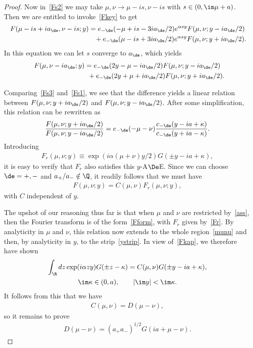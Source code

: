 \documentclass[pdftex]{sigma}
\numberwithin{equation}{section}
\begin{document}
\begin{proof}
Now in~\eqref{Fs2} we may take $\mu,\nu\to \mu-is,\nu-is$ with $s\in(0,\im\mu +a)$. Then we are entitled to invoke~\eqref{Fkey} to get
\begin{gather}
F(\mu-is+ia_{\de},\nu-is;y)     =     e_{-\de}(-\mu+is-3ia_{\de}/2)e^{\alpha sy}F(\mu,\nu;y-ia_{\de}/2)
\nonumber \\
\phantom{F(\mu-is+ia_{\de},\nu-is;y)     =}{}   +e_{-\de}(\mu-is+3ia_{\de}/2)e^{\alpha sy}F(\mu,\nu;y+ia_{\de}/2).
\end{gather}
In this equation we can let $s$ converge to $a_{\de}$, which yields
\begin{gather}
F(\mu,\nu-ia_{\de};y)     =     e_{-\de}(2y-\mu-ia_{\de}/2)F(\mu,\nu;y-ia_{\de}/2)
\nonumber \\
\phantom{F(\mu,\nu-ia_{\de};y)     =}{}  +e_{-\de}(2y+\mu+ia_{\de}/2)F(\mu,\nu;y+ia_{\de}/2).\label{Fs3}
\end{gather}

Comparing~\eqref{Fs3} and~\eqref{Fs1}, we see that the dif\/ference yields a linear relation between $F(\mu,\nu;y+ia_{\de}/2)$ and $F(\mu,\nu;y-ia_{\de}/2)$. After some simplif\/ication, this relation can be rewritten as
\begin{gather}\label{Fade}
\frac{F(\mu,\nu;y+ia_{\de}/2)}{F(\mu,\nu;y-ia_{\de}/2)}=e_{-\de}(-\mu-\nu)\frac{c_{-\de}(y-ia+\kappa)}{c_{-\de}(y+ia-\kappa)}.
\end{gather}
Introducing
\begin{gather}\label{Fr}
F_r(\mu,\nu;y)\equiv \exp(i\alpha (\mu+\nu)y/2)G(\pm y-ia+\kappa),
\end{gather}
it is easy to verify that $F_r$ also satisf\/ies this $y$-A$\De$E. Since we can choose $\de=+,-$ and $a_{+}/a_{-}\notin\Q$, it readily follows that we must have
\begin{gather}\label{Fform}
F(\mu,\nu;y)=C(\mu,\nu)F_r(\mu,\nu;y),
\end{gather}
with $C$ independent of $y$.

The upshot of our reasoning thus far is that when $\mu$ and $\nu$ are restricted by~\eqref{ass}, then the Fourier transform is of the form~\eqref{Fform}, with $F_r$ given by~\eqref{Fr}. By analyticity in $\mu$ and $\nu$, this relation now extends to the whole region~\eqref{munu} and then, by analyticity in $y$, to the strip~\eqref{ystrip}. In view of~\eqref{Fkap}, we therefore have shown
\begin{gather}
\int_{\R}dz\exp(i\alpha zy)G(\pm z-\kappa)=C(\mu,\nu)G(\pm y-ia+\kappa),\\
 \im \kappa \in (0,a),\qquad |\im y|<\im \kappa.\nonumber
\end{gather}
It follows from this that we have
\begin{gather}
C(\mu,\nu)=D(\mu-\nu),
\end{gather}
so it remains to prove
\begin{gather}
D(\mu-\nu)=(a_{+}a_{-})^{1/2} G(ia+\mu-\nu).
\end{gather}


\end{proof}
\end{document}
